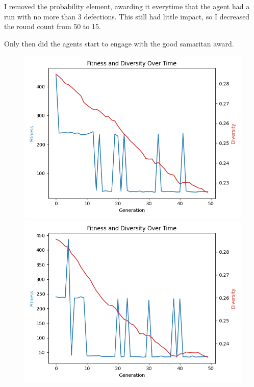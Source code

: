 \documentclass[11pt]{scrartcl} %
\begin{document}
I removed the probability element, awarding it everytime that the agent had a run with no more than 3 defections. This still had little impact, so I decreased the round count from 50 to 15.

Only then did the agents start to engage with the good samaritan award.
\begin{figure}[H]
    \centering
    \begin{minipage}{0.45\textwidth}
        \centering
        \includegraphics[width=\linewidth]{Figures/part_2/goodSamC1.png}
    \end{minipage}\hfill
    \begin{minipage}{0.45\textwidth}
        \centering
        \includegraphics[width=\linewidth]{Figures/part_2/goodSamC22.png}

\end{minipage}
\end{figure}
\end{document}
